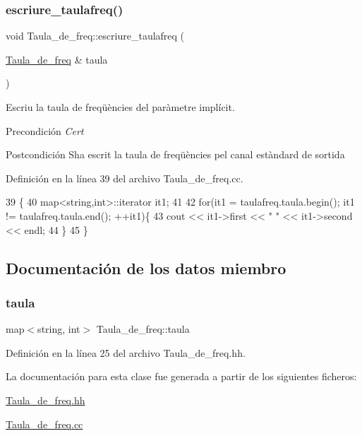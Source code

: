 \subsubsection{\texorpdfstring{escriure\+\_\+taulafreq()}{escriure\_taulafreq()}}
{\footnotesize\ttfamily void Taula\+\_\+de\+\_\+freq\+::escriure\+\_\+taulafreq (\begin{DoxyParamCaption}\item[{\hyperlink{class_taula__de__freq}{Taula\+\_\+de\+\_\+freq} \&}]{taula }\end{DoxyParamCaption})}



Escriu la taula de freqüències del paràmetre implícit. 

\begin{DoxyPrecond}{Precondición}
{\itshape Cert} 
\end{DoxyPrecond}
\begin{DoxyPostcond}{Postcondición}
S\textquotesingle{}ha escrit la taula de freqüències pel canal estàndard de sortida 
\end{DoxyPostcond}


Definición en la línea 39 del archivo Taula\+\_\+de\+\_\+freq.\+cc.


\begin{DoxyCode}
39                                                               \{
40     map<string,int>::iterator it1; 
41     
42     \textcolor{keywordflow}{for}(it1 = taulafreq.taula.begin(); it1 != taulafreq.taula.end(); ++it1)\{
43         cout << it1->first << \textcolor{stringliteral}{" "} << it1->second << endl;
44     \}
45 \}
\end{DoxyCode}


\subsection{Documentación de los datos miembro}
\mbox{\label{class_taula__de__freq_a2c7db75db1ccbbe347de775844f3bbd7}} 
\subsubsection{\texorpdfstring{taula}{taula}}
{\footnotesize\ttfamily map$<$string, int$>$ Taula\+\_\+de\+\_\+freq\+::taula\hspace{0.3cm}{\ttfamily [private]}}



Definición en la línea 25 del archivo Taula\+\_\+de\+\_\+freq.\+hh.



La documentación para esta clase fue generada a partir de los siguientes ficheros\+:\begin{DoxyCompactItemize}
\item 
\hyperlink{_taula__de__freq_8hh}{Taula\+\_\+de\+\_\+freq.\+hh}\item 
\hyperlink{_taula__de__freq_8cc}{Taula\+\_\+de\+\_\+freq.\+cc}\end{DoxyCompactItemize}
